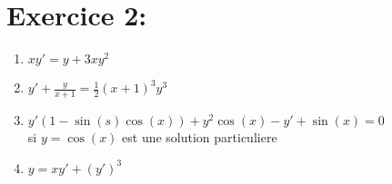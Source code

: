 \documentclass[a4paper,12pt]{article}
\begin{document}

\section*{Exercice 2:}
\begin{enumerate}
	\item $xy' = y + 3xy^2$
	
	\item $y' + \frac{y}{x+1} = \frac{1}{2} (x+1)^3 y^3$
	
	\item $y' (1 -\sin(s)\cos(x)) + y^2\cos(x) -y' + \sin(x) = 0$ \\ si $y = \cos(x)$ est une solution particuliere
	
	\item $y = xy' + (y')^3$
\end{enumerate}
\end{document}
